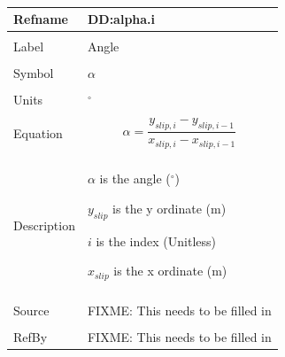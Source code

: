 \documentclass[12pt]{article}
\begin{document}
~\newline
\noindent \begin{minipage}{\textwidth}
\begin{tabular}{p{} p{}}
\toprule \textbf{Refname} & \textbf{DD:alpha.i}
\label{DD:alpha.i}
\\ \midrule \\
Label & Angle
\\ \midrule \\
Symbol & $α$
\\ \midrule \\
Units & ${}^{\circ}$
\\ \midrule \\
Equation & \begin{dmath}
           α=\frac{{y_{slip,i}}-{y_{slip,i-1}}}{{x_{slip,i}}-{x_{slip,i-1}}}
           \end{dmath}
\\ \midrule \\
Description & \begin{symbDescription}
              \item{$α$ is the angle (${}^{\circ}$)}
              \item{${y_{slip}}$ is the y ordinate (m)}
              \item{$i$ is the index (Unitless)}
              \item{${x_{slip}}$ is the x ordinate (m)}
              \end{symbDescription}
\\ \midrule \\
Source & FIXME: This needs to be filled in
\\ \midrule \\
RefBy & FIXME: This needs to be filled in
\\ \bottomrule \end{tabular}
\end{minipage}\\
~\newline
\end{document}
